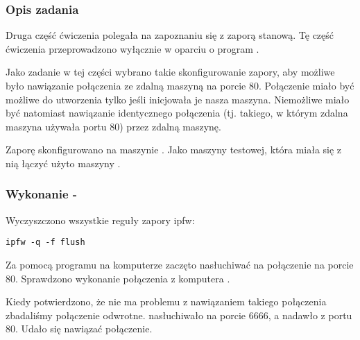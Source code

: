 \subsubsection{Opis zadania}
Druga część ćwiczenia polegała na zapoznaniu się z zaporą stanową.
Tę część ćwiczenia przeprowadzono wyłącznie w oparciu o program \ipfw{}.

Jako zadanie w tej części wybrano takie skonfigurowanie zapory, aby możliwe było nawiązanie połączenia ze zdalną maszyną na porcie 80.
Połączenie miało być możliwe do utworzenia tylko jeśli inicjowała je nasza maszyna.
Niemożliwe miało być natomiast nawiązanie identycznego połączenia (tj. takiego, w którym zdalna maszyna używała portu 80) przez zdalną maszynę.

Zaporę skonfigurowano na maszynie \kdwa{}.
Jako maszyny testowej, która miała się z nią łączyć użyto maszyny \kpiec{}.






\subsubsection{Wykonanie - \pf{}}
Wyczyszczono wszystkie reguły zapory ipfw:
\begin{lstlisting}
ipfw -q -f flush
\end{lstlisting}

Za pomocą programu \nc{} na komputerze \kpiec{} zaczęto nasłuchiwać na połączenie na porcie 80.
Sprawdzono wykonanie połączenia z komputera \kdwa{}.

Kiedy potwierdzono, że nie ma problemu z nawiązaniem takiego połączenia zbadaliśmy połączenie odwrotne.
\kdwa{} nasłuchiwało na porcie 6666, a nadawło z portu 80.
Udało się nawiązać połączenie.

